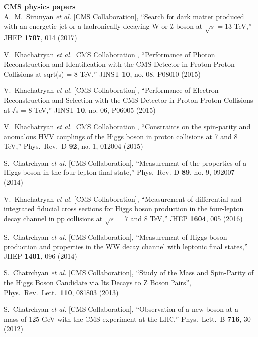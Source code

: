         {\bf CMS physics papers}
        \\    

  A.~M.~Sirunyan {\it et al.} [CMS Collaboration],
  ``Search for dark matter produced with an energetic jet or a hadronically decaying W or Z boson at $ \sqrt{s}=13 $ TeV,''
  JHEP {\bf 1707}, 014 (2017)

  V.~Khachatryan {\it et al.} [CMS Collaboration],
  ``Performance of Photon Reconstruction and Identification with the CMS Detector in Proton-Proton Collisions at sqrt(s) = 8 TeV,''
  JINST {\bf 10}, no. 08, P08010 (2015)

  V.~Khachatryan {\it et al.} [CMS Collaboration],
  ``Performance of Electron Reconstruction and Selection with the CMS Detector in Proton-Proton Collisions at √s = 8  TeV,''
  JINST {\bf 10}, no. 06, P06005 (2015)

  V.~Khachatryan {\it et al.} [CMS Collaboration],
  ``Constraints on the spin-parity and anomalous HVV couplings of the Higgs boson in proton collisions at 7 and 8 TeV,''
  Phys.\ Rev.\ D {\bf 92}, no. 1, 012004 (2015)

  S.~Chatrchyan {\it et al.} [CMS Collaboration],
  ``Measurement of the properties of a Higgs boson in the four-lepton final state,''
  Phys.\ Rev.\ D {\bf 89}, no. 9, 092007 (2014)

  V.~Khachatryan {\it et al.} [CMS Collaboration],
  ``Measurement of differential and integrated fiducial cross sections for Higgs boson production in the four-lepton decay channel in pp collisions at $ \sqrt{s}=7 $ and 8 TeV,''
  JHEP {\bf 1604}, 005 (2016)

  S.~Chatrchyan {\it et al.} [CMS Collaboration],
  ``Measurement of Higgs boson production and properties in the WW decay channel with leptonic final states,''
  JHEP {\bf 1401}, 096 (2014)

  S.~Chatrchyan {\it et al.}  [CMS Collaboration],
  ``Study of the Mass and Spin-Parity of the Higgs Boson Candidate via Its Decays to Z Boson Pairs'',
  Phys.\ Rev.\ Lett.\  {\bf 110}, 081803 (2013)

  S.~Chatrchyan {\it et al.}  [CMS Collaboration],
  ``Observation of a new boson at a mass of 125 GeV with the CMS experiment at the LHC,''
  Phys.\ Lett.\ B {\bf 716}, 30 (2012)

